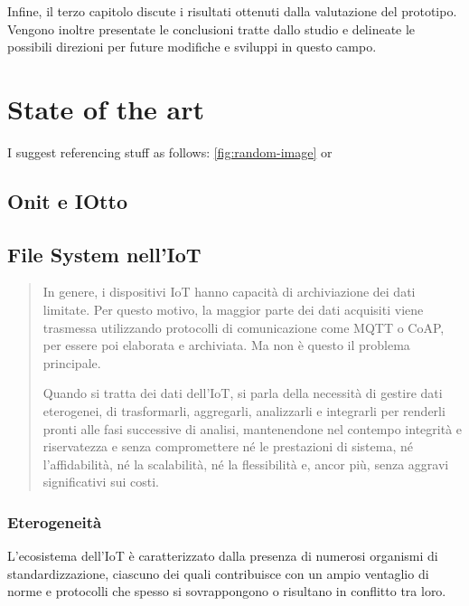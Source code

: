 \documentclass[12pt,a4paper,openright,twoside]{book}
\begin{document}
        Infine, il terzo capitolo discute i risultati ottenuti dalla valutazione del prototipo. Vengono inoltre presentate le conclusioni tratte dallo studio e delineate le possibili direzioni per future modifiche e sviluppi in questo campo.

\chapter{State of the art}

I suggest referencing stuff as follows: \cref{fig:random-image} or 


\section{Onit e IOtto}

\section{File System nell'IoT}

    \begin{quote}
        In genere, i dispositivi IoT hanno capacità di archiviazione dei dati limitate. Per questo motivo, la maggior parte dei dati acquisiti viene trasmessa utilizzando protocolli di comunicazione come MQTT o CoAP, per essere poi elaborata e archiviata. Ma non è questo il problema principale.

        Quando si tratta dei dati dell’IoT, si parla della necessità di gestire dati eterogenei, di trasformarli, aggregarli, analizzarli e integrarli per renderli pronti alle fasi successive di analisi, mantenendone nel contempo integrità e riservatezza e senza compromettere né le prestazioni di sistema, né l’affidabilità, né la scalabilità, né la flessibilità e, ancor più, senza aggravi significativi sui costi.
        \cite{sowa2014}
    \end{quote}

    \subsection{Eterogeneità}
        L'ecosistema dell'\ac{IoT} è caratterizzato dalla presenza di numerosi organismi di standardizzazione, ciascuno dei quali contribuisce con un ampio ventaglio di norme e protocolli che spesso si sovrappongono o risultano in conflitto tra loro.
\end{document}
